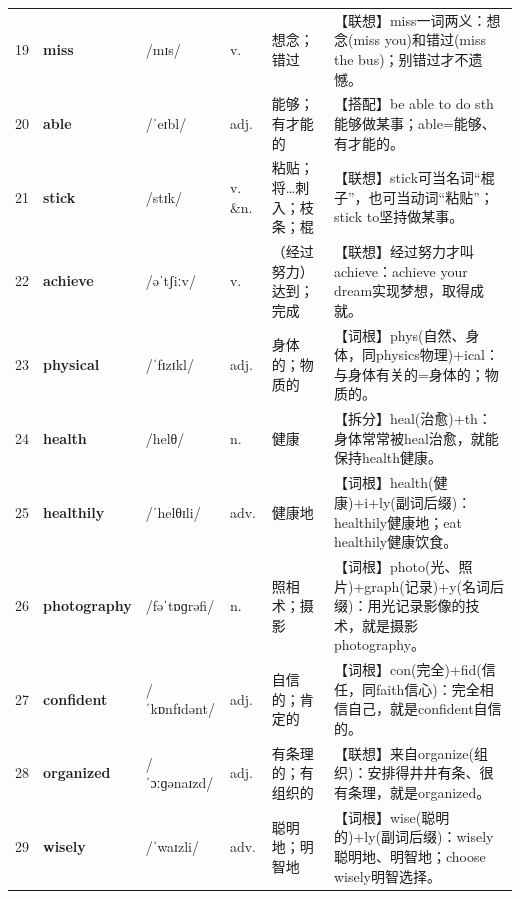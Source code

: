 \documentclass[UTF8,a4paper,11pt,oneside]{ctexbook}
\newcommand{\cellword}[1]{{\bfseries\textcolor{wordcol}{#1}}}
\newcommand{\cellipa}[1]{{\footnotesize\textcolor{ipacol}{#1}}}
\newcommand{\cellpos}[1]{\textcolor{poscol}{#1}}
\newcommand{\cellno}[1]{\textcolor{volcolor!75!black}{#1}}
\begin{document}
{\begin{longtable}{@{}C{0.045\textwidth}L{0.155\textwidth}L{0.175\textwidth}C{0.070\textwidth}L{0.180\textwidth}L{0.282\textwidth}@{}}
 \cellno{19} & \cellword{miss} & \cellipa{/mɪs/} & \cellpos{v.} & 想念；错过 & \textcolor{tagAssoc}{【联想】}miss一词两义：想念(miss you)和错过(miss the bus)；别错过才不遗憾。 \\
\cellno{20} & \cellword{able} & \cellipa{/ˈeɪbl/} & \cellpos{adj.} & 能够；有才能的 & \textcolor{tagColloc}{【搭配】}be able to do sth能够做某事；able=能够、有才能的。 \\
 \cellno{21} & \cellword{stick} & \cellipa{/stɪk/} & \cellpos{v. \&n.} & 粘贴；将…刺入；枝条；棍 & \textcolor{tagAssoc}{【联想】}stick可当名词“棍子”，也可当动词“粘贴”；stick to坚持做某事。 \\
\cellno{22} & \cellword{achieve} & \cellipa{/əˈtʃiːv/} & \cellpos{v.} & （经过努力）达到；完成 & \textcolor{tagAssoc}{【联想】}经过努力才叫achieve：achieve your dream实现梦想，取得成就。 \\
 \cellno{23} & \cellword{physical} & \cellipa{/ˈfɪzɪkl/} & \cellpos{adj.} & 身体的；物质的 & \textcolor{tagRoot}{【词根】}phys(自然、身体，同physics物理)+ical：与身体有关的=身体的；物质的。 \\
\cellno{24} & \cellword{health} & \cellipa{/helθ/} & \cellpos{n.} & 健康 & \textcolor{tagSplit}{【拆分】}heal(治愈)+th：身体常常被heal治愈，就能保持health健康。 \\
 \cellno{25} & \cellword{healthily} & \cellipa{/ˈhelθɪli/} & \cellpos{adv.} & 健康地 & \textcolor{tagRoot}{【词根】}health(健康)+i+ly(副词后缀)：healthily健康地；eat healthily健康饮食。 \\
\cellno{26} & \cellword{photography} & \cellipa{/fəˈtɒɡrəfi/} & \cellpos{n.} & 照相术；摄影 & \textcolor{tagRoot}{【词根】}photo(光、照片)+graph(记录)+y(名词后缀)：用光记录影像的技术，就是摄影photography。 \\
 \cellno{27} & \cellword{confident} & \cellipa{/ˈkɒnfɪdənt/} & \cellpos{adj.} & 自信的；肯定的 & \textcolor{tagRoot}{【词根】}con(完全)+fid(信任，同faith信心)：完全相信自己，就是confident自信的。 \\
\cellno{28} & \cellword{organized} & \cellipa{/ˈɔːɡənaɪzd/} & \cellpos{adj.} & 有条理的；有组织的 & \textcolor{tagAssoc}{【联想】}来自organize(组织)：安排得井井有条、很有条理，就是organized。 \\
 \cellno{29} & \cellword{wisely} & \cellipa{/ˈwaɪzli/} & \cellpos{adv.} & 聪明地；明智地 & \textcolor{tagRoot}{【词根】}wise(聪明的)+ly(副词后缀)：wisely聪明地、明智地；choose wisely明智选择。 \\

\end{longtable}}
\end{document}
